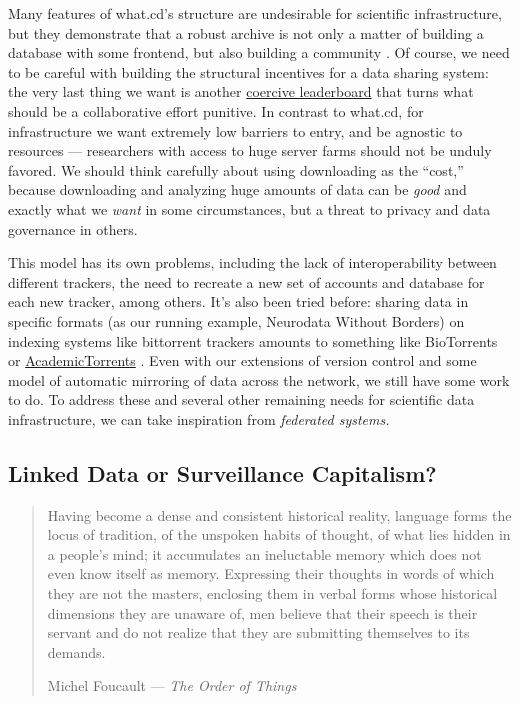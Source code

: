 Many features of what.cd's structure are undesirable for scientific
infrastructure, but they demonstrate that a robust archive is not only a
matter of building a database with some frontend, but also building a
community \citep{brossCommunityCollaborationContribution2013} . Of
course, we need to be careful with building the structural incentives
for a data sharing system: the very last thing we want is another
\href{https://etiennelebel.com/cs/t-leaderboard/t-leaderboard.html}{coercive
leaderboard} that turns what should be a collaborative effort punitive.
In contrast to what.cd, for infrastructure we want extremely low
barriers to entry, and be agnostic to resources --- researchers with
access to huge server farms should not be unduly favored. We should
think carefully about using downloading as the ``cost,'' because
downloading and analyzing huge amounts of data can be \emph{good} and
exactly what we \emph{want} in some circumstances, but a threat to
privacy and data governance in others.

This model has its own problems, including the lack of interoperability
between different trackers, the need to recreate a new set of accounts
and database for each new tracker, among others. It's also been tried
before: sharing data in specific formats (as our running example,
Neurodata Without Borders) on indexing systems like bittorrent trackers
amounts to something like BioTorrents \citep{langilleBioTorrentsFileSharing2010}  or
\href{https://academictorrents.com/}{AcademicTorrents} \citep{cohenAcademicTorrentsCommunityMaintained2014} . Even with our
extensions of version control and some model of automatic mirroring of
data across the network, we still have some work to do. To address these
and several other remaining needs for scientific data infrastructure, we
can take inspiration from \emph{federated systems.}

\hypertarget{linked-data-or-surveillance-capitalism}{%
\subsection{Linked Data or Surveillance
Capitalism?}\label{linked-data-or-surveillance-capitalism}}

\begin{quote}
Having become a dense and consistent historical reality, language forms
the locus of tradition, of the unspoken habits of thought, of what lies
hidden in a people's mind; it accumulates an ineluctable memory which
does not even know itself as memory. Expressing their thoughts in words
of which they are not the masters, enclosing them in verbal forms whose
historical dimensions they are unaware of, men believe that their speech
is their servant and do not realize that they are submitting themselves
to its demands.

Michel Foucault --- \emph{The Order of Things} \citep{foucaultOrderThings2001} 
\end{quote}

